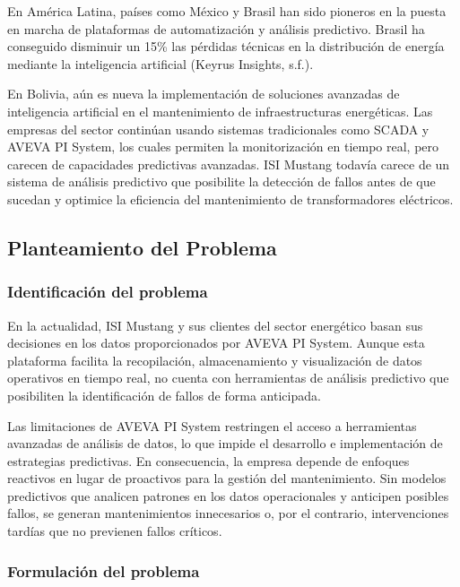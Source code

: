 \documentclass{univalle-perfil}
\begin{document}
En América Latina, países como México y Brasil han sido pioneros en la puesta en
marcha de plataformas de automatización y análisis predictivo. Brasil ha conseguido
disminuir un 15\% las pérdidas técnicas en la distribución de energía mediante la
inteligencia artificial (Keyrus Insights, s.f.).

En Bolivia, aún es nueva la implementación de soluciones avanzadas de inteligencia
artificial en el mantenimiento de infraestructuras energéticas. Las empresas del
sector continúan usando sistemas tradicionales como SCADA y AVEVA PI System,
los cuales permiten la monitorización en tiempo real, pero carecen de capacidades
predictivas avanzadas. ISI Mustang todavía carece de un sistema de análisis
predictivo que posibilite la detección de fallos antes de que sucedan y optimice la
eficiencia del mantenimiento de transformadores eléctricos.

\subsection{Planteamiento del Problema}

\subsubsection{Identificación del problema}

En la actualidad, ISI Mustang y sus clientes del sector energético basan sus
decisiones en los datos proporcionados por AVEVA PI System. Aunque esta
plataforma facilita la recopilación, almacenamiento y visualización de datos
operativos en tiempo real, no cuenta con herramientas de análisis predictivo que
posibiliten la identificación de fallos de forma anticipada.

Las limitaciones de AVEVA PI System restringen el acceso a herramientas avanzadas
de análisis de datos, lo que impide el desarrollo e implementación de estrategias
predictivas. En consecuencia, la empresa depende de enfoques reactivos en lugar de
proactivos para la gestión del mantenimiento. Sin modelos predictivos que analicen
patrones en los datos operacionales y anticipen posibles fallos, se generan
mantenimientos innecesarios o, por el contrario, intervenciones tardías que no
previenen fallos críticos.

\subsubsection{Formulación del problema}
\end{document}
